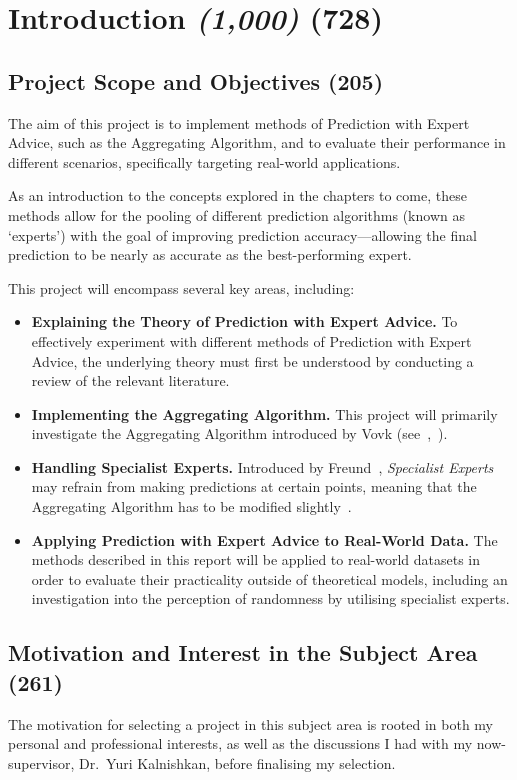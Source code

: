 \section{Introduction \textit{(1,000)} \textbf{(728)}}\label{section:introduction}

\subsection{Project Scope and Objectives \textbf{(205)}}
The aim of this project is to implement methods of Prediction with Expert Advice, such as the Aggregating Algorithm, and to evaluate their performance in different scenarios, specifically targeting  real-world applications. 

As an introduction to the concepts explored in the chapters to come, these methods allow for the pooling of different prediction algorithms (known as `experts') with the goal of improving prediction accuracy---allowing the final prediction to be nearly as accurate as the best-performing expert.

This project will encompass several key areas, including:
\begin{itemize}
    \item \textbf{Explaining the Theory of Prediction with Expert Advice.} To effectively experiment with different methods of Prediction with Expert Advice, the underlying theory must first be understood by conducting a review of the relevant literature.
    \item \textbf{Implementing the Aggregating Algorithm.} This project will primarily investigate the Aggregating Algorithm introduced by Vovk (see~\cite{vovk:1990},\ \cite{vovk:1998}).
    \item \textbf{Handling Specialist Experts.} Introduced by Freund~\cite{freund:1997}, \textit{Specialist Experts} may refrain from making predictions at certain points, meaning that the Aggregating Algorithm has to be modified slightly~\cite{kalnishkan:2015}.
    \item \textbf{Applying Prediction with Expert Advice to Real-World Data.} The methods described in this report will be applied to real-world datasets in order to evaluate their practicality outside of theoretical models, including an investigation into the perception of randomness by utilising specialist experts.
\end{itemize}

\subsection{Motivation and Interest in the Subject Area \textbf{(261)}}
The motivation for selecting a project in this subject area is rooted in both my personal and professional interests, as well as the discussions I had with my now-supervisor, Dr.\ Yuri Kalnishkan, before finalising my selection.

